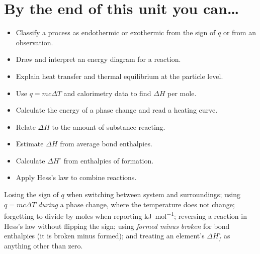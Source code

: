 \documentclass{apchem-worksheet}
\begin{document}
\section*{\sffamily By the end of this unit you can\ldots}

\begin{itemize}[leftmargin=*,itemsep=0.12em]
  \item Classify a process as endothermic or exothermic from the sign of
        $q$ or from an observation. 
  \item Draw and interpret an energy diagram for a reaction. 
  \item Explain heat transfer and thermal equilibrium at the particle
        level. 
  \item Use $q = mc\Delta T$ and calorimetry data to find $\Delta H$ per
        mole. 
  \item Calculate the energy of a phase change and read a heating curve.
  \item Relate $\Delta H$ to the amount of substance reacting. 
  \item Estimate $\Delta H$ from average bond enthalpies. 
  \item Calculate $\Delta H^\circ$ from enthalpies of formation. 
  \item Apply Hess's law to combine reactions. 
\end{itemize}

\begin{apctrap}
Losing the sign of $q$ when switching between system and surroundings;
using $q = mc\Delta T$ \emph{during} a phase change, where the temperature
does not change; forgetting to divide by moles when reporting
\si{\kilo\joule\per\mole}; reversing a reaction in Hess's law without
flipping the sign; using \emph{formed minus broken} for bond enthalpies
(it is broken minus formed); and treating an element's
$\Delta H_f^\circ$ as anything other than zero.
\end{apctrap}
\end{document}

